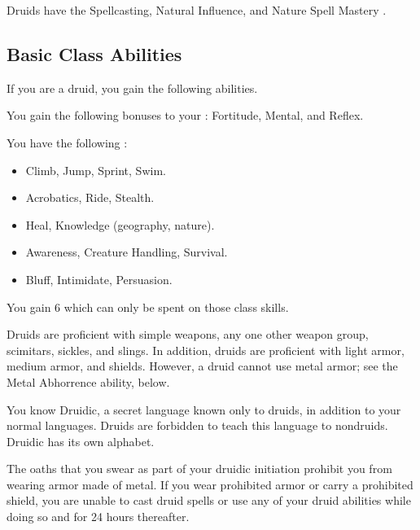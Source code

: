      Druids have the Spellcasting, Natural Influence, and Nature Spell Mastery .

    \subsection{Basic Class Abilities}
        If you are a druid, you gain the following abilities.

        You gain the following bonuses to your :  Fortitude,  Mental, and  Reflex.

        You have the following :
        \begin{itemize}
            \item {} Climb, Jump, Sprint, Swim.
            \item {} Acrobatics, Ride, Stealth.
            \item {} Heal, Knowledge (geography, nature).
            \item {} Awareness, Creature Handling, Survival.
            \item {} Bluff, Intimidate, Persuasion.
        \end{itemize}
        You gain 6  which can only be spent on those class skills.

        Druids are proficient with simple weapons, any one other weapon group, scimitars, sickles, and slings.
        In addition, druids are proficient with light armor, medium armor, and shields.
        However, a druid cannot use metal armor; see the Metal Abhorrence ability, below.

        You know Druidic, a secret language known only to druids, in addition to your normal languages.
        Druids are forbidden to teach this language to nondruids.
        Druidic has its own alphabet.

        The oaths that you swear as part of your druidic initiation prohibit you from wearing armor made of metal.
        If you wear prohibited armor or carry a prohibited shield, you are unable to cast druid spells or use any of your  druid abilities while doing so and for 24 hours thereafter.

